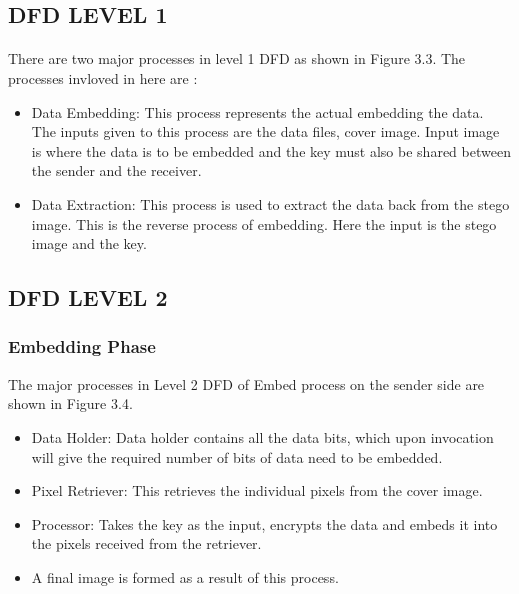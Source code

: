 \documentclass[12pt]{report}
\begin{document}
\subsection{DFD LEVEL 1}
\paragraph{}There are two major processes in level 1 DFD as shown in Figure 3.3. The processes invloved in here are :
\begin{itemize}
\item Data Embedding: This process represents the actual embedding the data. The inputs given to this process are the data files, cover image. Input image is where the data is to be embedded and the key must also be shared between the sender and the receiver.
\item Data Extraction: This process is used to extract the data back from the stego image. This is the reverse process of embedding. Here the input is the stego image and the key.
\end{itemize}
\pagebreak
\subsection{DFD LEVEL 2}
\subsubsection{Embedding Phase}
The major processes in Level 2 DFD of Embed process on the sender side are shown in Figure 3.4.
\begin{itemize}
\item Data Holder: Data holder contains all the data bits, which upon invocation will give the required number of bits of data need to be embedded.
\item Pixel Retriever: This retrieves the individual pixels from the cover image. 
\item Processor: Takes the key as the input, encrypts the data and embeds it into the pixels received from the retriever. 
\item A final image is formed as a result of this process.
\end{itemize}
\pagebreak
\end{document}

